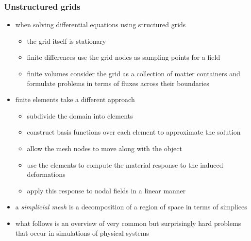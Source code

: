 %
%


\begin{frame}[fragile]
%
  \frametitle{Unstructured grids}
%
  \begin{itemize}
%
  \item when solving differential equations using structured grids
    \begin{itemize}
    \item the grid itself is stationary
    \item finite differences use the grid nodes as sampling points for a field
    \item finite volumes consider the grid as a collection of matter containers and formulate
      problems in terms of fluxes across their boundaries
    \end{itemize}
%
  \item finite elements take a different approach
    \begin{itemize}
    \item subdivide the domain into elements
    \item construct basis functions over each element to approximate the solution
    \item allow the mesh nodes to move along with the object
    \item use the elements to compute the material response to the induced deformations
    \item apply this response to nodal fields in a linear manner
    \end{itemize}
%
  \item a {\em simplicial mesh} is a decomposition of a region of space in terms of simplices
%
  \item what follows is an overview of very common but surprisingly hard problems that occur in
    simulations of physical systems
  \end{itemize}
%
\end{frame}

